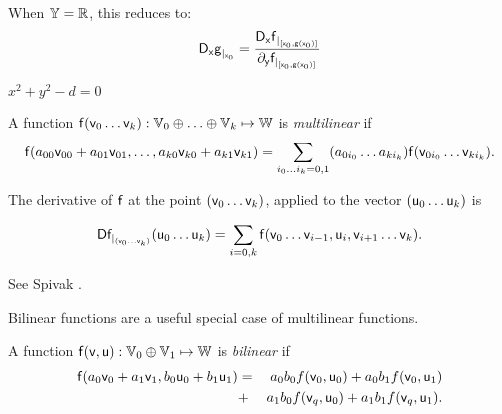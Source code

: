 When $\mathbb{Y}=\mathbb{R}$, this reduces to:
\begin{equation}
{\mathsf{D}_{\ensuremath{\mathsf{x}}}{\ensuremath{\mathsf{g}}}}_{\mid_{\mathsf{x}_0}}
=
\dfrac{
{\mathsf{D}_{\mathsf{x}}{\mathsf{f}}}_{\mid_{\left[ \mathsf{x}_0 , \mathsf{g}\left( \mathsf{x}_0 \right) \right]}}
}{
{\partial}_{\mathsf{y}}{\mathsf{f}}_{\mid_{\left[ \mathsf{x}_0 , \mathsf{g}\left( \mathsf{x}_0 \right) \right]}}
}
\end{equation}

\begin{example}[Circle]
$x^2 + y^2 - d = 0$
\end{example}

\label{sec:Derivatives-of-multilinear-functions}

A function
 $\mathsf{f}(\mathsf{v}_0 \ldots \mathsf{v}_k):\mathbb{V}_0 \oplus \ldots \oplus \mathbb{V}_k \mapsto \mathbb{W}$
is \textit{multilinear} if
\begin{equation}
\mathsf{f}(a_{00} \mathsf{v}_{00} + a_{01} \mathsf{v}_{01}, \ldots, a_{k0} \mathsf{v}_{k0} + a_{k1} \mathsf{v}_{k1})
 =  \sum_{i_0 \ldots i_k = 0,1} (a_{0i_0} \ldots a_{ki_k}) \mathsf{f}(\mathsf{v}_{0i_0} \ldots \mathsf{v}_{ki_k}).
\end{equation}

The derivative of $\mathsf{f}$
at the point $(\mathsf{v}_0 \ldots \mathsf{v}_k)$, applied to the vector $(\mathsf{u}_0 \ldots \mathsf{u}_k)$ is

\begin{equation}
{\mathsf{D}{\mathsf{f}}_{\mid_{(\mathsf{v}_0 \ldots \mathsf{v}_k)}}({\mathsf{u}_0 \ldots \mathsf{u}_k})}
 =  \sum_{i=0,k} \mathsf{f}(\mathsf{v}_0 \ldots \mathsf{v}_{i-1},\mathsf{u}_i,\mathsf{v}_{i+1} \ldots \mathsf{v}_k).
\end{equation}

See Spivak \cite[ex.~2-14]{spivak-1965}.

\label{sec:Derivatives-of-bilinear-functions}

Bilinear functions are a useful special case of multilinear functions.

A function $\mathsf{f}(\mathsf{v},\mathsf{u}):\mathbb{V}_0 \oplus \mathbb{V}_1 \mapsto \mathbb{W}$
is \textit{bilinear} if
\begin{eqnarray}
\mathsf{f}(a_0 \mathsf{v}_0 + a_1 \mathsf{v}_1, b_0 \mathsf{u}_0 + b_1 \mathsf{u}_1)
& =  & a_0 b_0 f(\mathsf{v}_0,\mathsf{u}_0)
+  a_0 b_1 f(\mathsf{v}_0,\mathsf{u}_1)
\\
& +  & a_1 b_0 f(\mathsf{v}_q,\mathsf{u}_0)
 +  a_1 b_1 f(\mathsf{v}_q,\mathsf{u}_1).
\nonumber
\end{eqnarray}

